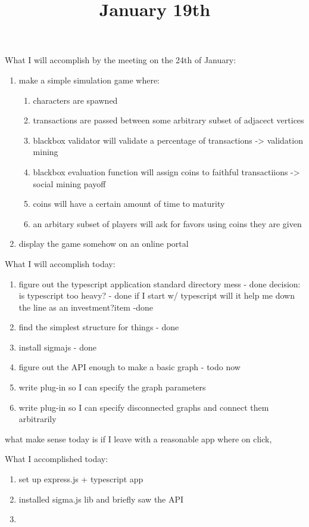 \title{January 19th}

What I will accomplish by the meeting on the 24th of January:

\begin{enumerate}
	\item make a simple simulation game where:
		\begin{enumerate}
			\item characters are spawned
			\item transactions are passed between some arbitrary subset of adjacect vertices
			\item blackbox validator will validate a percentage of transactions  -> validation mining
			\item blackbox evaluation function will assign coins to faithful transactiions -> social mining payoff
			\item coins will have a certain amount of time to maturity
			\item an arbitary subset of players will ask for favors using coins they are given
		\end{enumerate}
	\item display the game somehow on an online portal
\end{enumerate}

What I will accomplish today:

\begin{enumerate}
	\item figure out the typescript application standard directory mess - done
		decision: is typescript too heavy? - done
		if I start w/ typescript will it help me down the line as an investment?item -done
	\item find the simplest structure for things - done
	\item install sigmajs  - done
	\item figure out the API enough to make a basic graph - todo now
	\item write plug-in so I can specify the graph parameters
	\item write plug-in so I can specify disconnected graphs and connect them arbitrarily
\end{enumerate}
what make sense today is if I leave with a reasonable app where on click,


What I accomplished today:

\begin{enumerate}
	\item set up express.js + typescript app
	\item installed sigma.js lib and briefly saw the API
	\item 
\end{enumerate}

